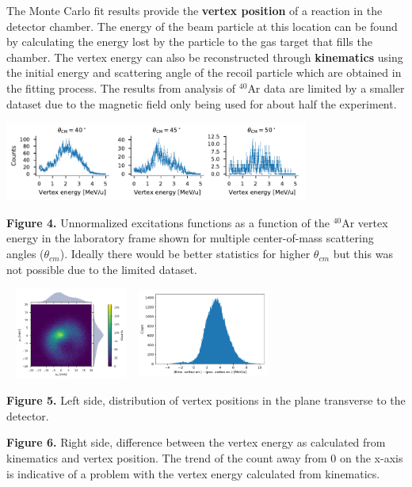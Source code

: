 \documentclass[a0paper,portrait]{baposter}
\begin{document}
\begin{poster}
{\small{The Monte Carlo fit results provide the \textbf{vertex position} of a reaction in the detector chamber. The energy of the beam particle at this location can be found by calculating the energy lost by the particle to the gas target that fills the chamber. The vertex energy can also be reconstructed through \textbf{kinematics} using the initial energy and scattering angle of the recoil particle which are obtained in the fitting process. The results from analysis of $^{40}$Ar data are limited by a smaller dataset due to the magnetic field only being used for about half the experiment.}
\begin{center}
\includegraphics [width=100mm] {angular_excitation_hists_POSTER.pdf}
\end{center}
\small{\textbf{Figure 4.} Unnormalized excitations functions as a function of the $^{40}$Ar vertex energy in the laboratory frame shown for multiple center-of-mass scattering angles ($\theta_{cm}$). Ideally there would be better statistics for higher $\theta_{cm}$ but this was not possible due to the limited dataset.}
\begin{center}
\includegraphics [height=30mm, width=43mm] {vertex_pos_distrib.pdf}
\hspace{.5cm}
\includegraphics [height=30mm, width=43mm] {vertex_en_error.pdf}
\end{center}
\small{\textbf{Figure 5.} Left side, distribution of vertex positions in the plane transverse to the detector.}

\small{\textbf{Figure 6.} Right side, difference between the vertex energy as calculated from kinematics and vertex position. The trend of the count away from 0 on the x-axis is indicative of a problem with the vertex energy calculated from kinematics.}
}


\end{poster}
\end{document}
